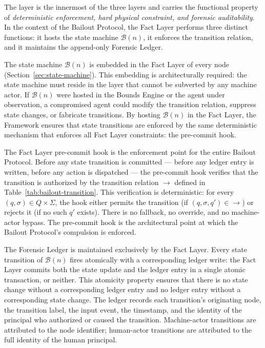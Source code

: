 The \fact{} layer is the innermost of the three \bxthree{} layers and carries the functional property of \emph{deterministic enforcement, hard physical constraint, and forensic auditability}. In the context of the Bailout Protocol, the Fact Layer performs three distinct functions: it hosts the state machine $\mathcal{B}(n)$, it enforces the transition relation, and it maintains the append-only Forensic Ledger.

The state machine $\mathcal{B}(n)$ is embedded in the Fact Layer of every \bxthree{} node (Section~\ref{sec:state-machine}). This embedding is architecturally required: the state machine must reside in the layer that cannot be subverted by any machine actor. If $\mathcal{B}(n)$ were hosted in the Bounds Engine or the agent under observation, a compromised agent could modify the transition relation, suppress state changes, or fabricate transitions. By hosting $\mathcal{B}(n)$ in the Fact Layer, the \bxthree{} Framework ensures that state transitions are enforced by the same deterministic mechanism that enforces all Fact Layer constraints: the pre-commit hook.

The Fact Layer pre-commit hook is the enforcement point for the entire Bailout Protocol. Before any state transition is committed --- before any ledger entry is written, before any action is dispatched --- the pre-commit hook verifies that the transition is authorized by the transition relation $\rightarrow$ defined in Table~\ref{tab:bailout-transition}. This verification is deterministic: for every $(q, \sigma) \in Q \times \Sigma$, the hook either permits the transition (if $(q, \sigma, q') \in \rightarrow$) or rejects it (if no such $q'$ exists). There is no fallback, no override, and no machine-actor bypass. The pre-commit hook is the architectural point at which the Bailout Protocol's compulsion is enforced.

The Forensic Ledger is maintained exclusively by the Fact Layer. Every state transition of $\mathcal{B}(n)$ fires atomically with a corresponding ledger write: the Fact Layer commits both the state update and the ledger entry in a single atomic transaction, or neither. This atomicity property ensures that there is no state change without a corresponding ledger entry and no ledger entry without a corresponding state change. The ledger records each transition's originating node, the transition label, the input event, the timestamp, and the identity of the principal who authorized or caused the transition. Machine-actor transitions are attributed to the node identifier; human-actor transitions are attributed to the full identity of the human principal.


